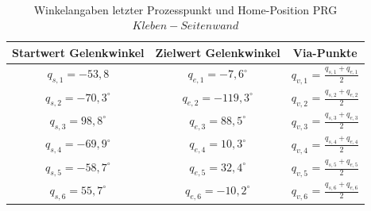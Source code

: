 \\
\begin{table}
\centering
\begin{tabular}{|c|c|c|}
	\hline
	Startwert Gelenkwinkel&  Zielwert Gelenkwinkel&  Via-Punkte\\
	\hline
	$q_{s,1} = -53,8$&  $q_{e,1} = -7,6^{\circ}$  &$q_{v,1}$ = $\tfrac{q_{s,1}+q_{e,1}}{2}$  \\
	\hline
	$q_{s,2} = -70,3^{\circ}$&  $q_{e,2} = -119,3^{\circ}$    &$q_{v,2}$ = $\tfrac{q_{s,2}+q_{e,2}}{2}$  \\
	\hline
	$q_{s,3} = 98,8^{\circ}$&  $q_{e,3} = 88,5^{\circ}$&$q_{v,3}$ = $\tfrac{q_{s,3}+q_{e,3}}{2}$  \\
	\hline
	$q_{s,4} = -69,9^{\circ}$&  $q_{e,4} = 10,3^{\circ}$&$q_{v,4}$ = $\tfrac{q_{s,4}+q_{e,4}}{2}$  \\
	\hline
	$q_{s,5} = -58,7^{\circ}$&  $q_{e,5} = 32,4^{\circ}$  &$q_{v,5}$ = $\tfrac{q_{s,5}+q_{e,5}}{2}$  \\
	\hline
	$q_{s,6} = 55,7^{\circ}$&  $q_{e,6} = -10,2^{\circ}$&$q_{v,6}$ = $\tfrac{q_{s,6}+q_{e,6}}{2}$  \\
	\hline
\end{tabular}
\caption{Winkelangaben letzter Prozesspunkt und Home-Position PRG $Kleben-Seitenwand$}
\label{tab:simu}
\end{table}
\\

